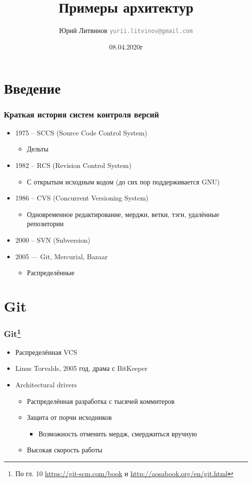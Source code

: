 \documentclass[xetex,mathserif,serif]{beamer}
\title{Примеры архитектур}
\author[Юрий Литвинов]{Юрий Литвинов \newline \textcolor{gray}{\small\texttt{yurii.litvinov@gmail.com}}}
\date{08.04.2020г}
\begin{document}
	
	\frame{\titlepage}

	\section{Введение}

	\begin{frame}
		\frametitle{Краткая история систем контроля версий}
		\begin{itemize}
			\item 1975 -- SCCS (Source Code Control System)
			\begin{itemize}
				\item Дельты
			\end{itemize}
			\item 1982 -- RCS (Revision Control System)
			\begin{itemize}
				\item С открытым исходным кодом (до сих пор поддерживается GNU)
			\end{itemize}
			\item 1986 -- CVS (Concurrent Versioning System)
			\begin{itemize}
				\item Одновременное редактирование, мерджи, ветки, тэги, удалённые репозитории
			\end{itemize}
			\item 2000 -- SVN (Subversion)
			\item 2005 --- Git, Mercurial, Bazaar
			\begin{itemize}
				\item Распределённые
			\end{itemize}
		\end{itemize}
	\end{frame}

	\section{Git}

	\begin{frame}
		\frametitle{Git\footnote{\tiny{По гл. 10 \url{https://git-scm.com/book} и \url{http://aosabook.org/en/git.html}}}}
		\begin{itemize}
			\item Распределённая VCS
			\item Linus Torvalds, 2005 год, драма с BitKeeper
			\item Architectural drivers
			\begin{itemize}
				\item Распределённая разработка с тысячей коммитеров
				\item Защита от порчи исходников
				\begin{itemize}
					\item Возможность отменить мердж, смерджиться вручную
				\end{itemize}
				\item Высокая скорость работы
			\end{itemize}
		\end{itemize}
	\end{frame}
\end{document}

